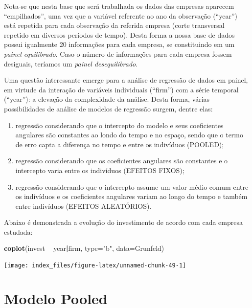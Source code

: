\documentclass[12pt,brazil,oneside]{book}
\newenvironment{Shaded}{\begin{snugshade}}{\end{snugshade}}
\newcommand{\DataTypeTok}[1]{\textcolor[rgb]{0.13,0.29,0.53}{#1}}
\newcommand{\KeywordTok}[1]{\textcolor[rgb]{0.13,0.29,0.53}{\textbf{#1}}}
\newcommand{\NormalTok}[1]{#1}
\newcommand{\OperatorTok}[1]{\textcolor[rgb]{0.81,0.36,0.00}{\textbf{#1}}}
\newcommand{\StringTok}[1]{\textcolor[rgb]{0.31,0.60,0.02}{#1}}
\begin{document}
Nota-se que nesta base que será trabalhada os dados das empresas aparecem ``empilhados'', uma vez que a variável referente ao ano da observação (``year'') está repetida para cada observação da referida empresa (corte transversal repetido em diversos períodos de tempo). Desta forma a nossa base de dados possui igualmente 20 informações para cada empresa, se constituindo em um \emph{painel equilibrado}. Caso o número de informações para cada empresa fossem desiguais, teríamos um \emph{painel desequilibrado}.

Uma questão interessante emerge para a análise de regressão de dados em painel, em virtude da interação de variáveis individuais (``firm'') com a série temporal (``year''): a elevação da complexidade da análise. Desta forma, várias possibilidades de análise de modelos de regressão surgem, dentre elas:

\begin{enumerate}
\def\labelenumi{\alph{enumi})}
\item
  regressão considerando que o intercepto do modelo e seus coeficientes angulares são constantes ao londo do tempo e no espaço, sendo que o termo de erro capta a diferença no tempo e entre os indivíduos (POOLED);
\item
  regressão considerando que os coeficientes angulares são constantes e o intercepto varia entre os indivíduos (EFEITOS FIXOS);
\item
  regressão considerando que o intercepto assume um valor médio comum entre os indivíduos e os coeficientes angulares variam ao longo do tempo e também entre indivíduos (EFEITOS ALEATÓRIOS).
\end{enumerate}

Abaixo é demonstrada a evolução do investimento de acordo com cada empresa estudada:

\begin{Shaded}
\begin{Highlighting}[]
\KeywordTok{coplot}\NormalTok{(invest }\OperatorTok{~}\StringTok{ }\NormalTok{year}\OperatorTok{|}\NormalTok{firm, }\DataTypeTok{type=}\StringTok{"b"}\NormalTok{, }\DataTypeTok{data=}\NormalTok{Grunfeld)}
\end{Highlighting}
\end{Shaded}

\begin{center}\texttt{[image: index\_files/figure-latex/unnamed-chunk-49-1]} \end{center}

\hypertarget{modelo-pooled}{%
\section{Modelo Pooled}\label{modelo-pooled}}
\end{document}
